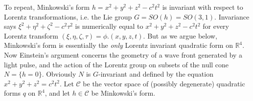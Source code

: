 \documentclass[12pt]{amsart}
\theoremstyle{definition}
\theoremstyle{remark}
\newcommand{\bR}{\mathbb{R}}
\newcommand{\sC}{\mathscr{C}}
\begin{document}
To repeat, Minkowski's form $h=x^2+y^2+z^2-c^2t^2$ is invariant with respect to Lorentz transformations, i.e. the Lie group $G=SO(h)=SO(3,1)$. Invariance says $\xi^2+\eta^2+\zeta^2-c^2 \tau^2$ is numerically equal to $x^2+y^2+z^2-c^2 t^2$ for every Lorentz transform $(\xi, \eta, \zeta, \tau)=\phi.(x,y,z,t)$. But as we argue below, Minkowski's form is essentially the \emph{only} Lorentz invariant quadratic form on $\bR^4$. Now Einstein's argument concerns the geometry of a wave front generated by a light pulse, and the action of the Lorentz group on subsets of the null cone $N=\{h=0\}$. Obviously $N$ is $G$-invariant and defined by the equation $x^2+y^2+z^2=c^2 t^2$. Let $\sC$ be the vector space of (possibly degenerate) quadratic forms $q$ on $\bR^4$, and let $h\in \sC$ be Minkowski's form. 







\end{document}
